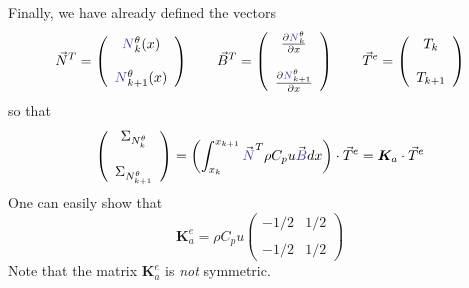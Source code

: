 Finally, we have already defined the vectors 
\[
{\vec N}^T = 
\left(
\begin{array}{c}
{\color{Violet}N}_k^\theta(x)  \\ \\  {\color{Violet}N}_{k+1}^\theta (x)
\end{array}
\right)
\quad\quad
{\vec B}^T=
\left(
\begin{array}{cc}
 \frac{\partial {\color{Violet}N}_k^\theta}{\partial x}   \\ \\
 \frac{\partial {\color{Violet}N}_{k+1}^\theta}{\partial x}
\end{array}
\right)
\quad
\quad
{\vec T}^e = 
\left(
\begin{array}{c}
T_k \\ \\ T_{k+1}
\end{array}
\right)
\]
so that 
\[
\left(
\begin{array}{c}
{\Sigma}_{N_k^\theta} \\  \\ {\Sigma}_{N_{k+1}^\theta}
\end{array}
\right)
=
\left( \int_{x_k}^{x_{k+1}}   {\vec {\color{Violet}N}}^T \rho C_p u {\vec {\color{Violet}B}} dx  \right) \cdot {\vec T}^e
= {\bm K}_a \cdot \vec T^e
\]
One can easily show that 
\[
{\bm K}_a^e=
\rho C_p u
\left(
\begin{array}{cc}
-1/2 & 1/2 \\ \\
-1/2 & 1/2 
\end{array}
\right)
\]
Note that the matrix ${\bm K}_a^e$ is {\sl not} symmetric. 

